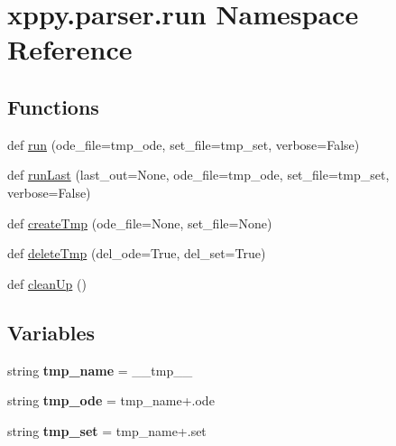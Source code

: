 \hypertarget{namespacexppy_1_1parser_1_1run}{}\section{xppy.\+parser.\+run Namespace Reference}
\label{namespacexppy_1_1parser_1_1run}
\subsection*{Functions}
\begin{DoxyCompactItemize}
\item 
def \mbox{\hyperlink{namespacexppy_1_1parser_1_1run_a32f88ffa66a68d043cef8d93210c7786}{run}} (ode\+\_\+file=tmp\+\_\+ode, set\+\_\+file=tmp\+\_\+set, verbose=False)
\item 
def \mbox{\hyperlink{namespacexppy_1_1parser_1_1run_ae60fb82821ae368a7b5cf41169ee9047}{run\+Last}} (last\+\_\+out=None, ode\+\_\+file=tmp\+\_\+ode, set\+\_\+file=tmp\+\_\+set, verbose=False)
\item 
def \mbox{\hyperlink{namespacexppy_1_1parser_1_1run_aa346685c25b7fcb37a1bd65b5dc96d32}{create\+Tmp}} (ode\+\_\+file=None, set\+\_\+file=None)
\item 
def \mbox{\hyperlink{namespacexppy_1_1parser_1_1run_ad400655fd25cbcf3e8baba3d7442af44}{delete\+Tmp}} (del\+\_\+ode=True, del\+\_\+set=True)
\item 
def \mbox{\hyperlink{namespacexppy_1_1parser_1_1run_adbf6786b0b0e4127eca343570c49d19b}{clean\+Up}} ()
\end{DoxyCompactItemize}
\subsection*{Variables}
\begin{DoxyCompactItemize}
\item 
\mbox{\label{namespacexppy_1_1parser_1_1run_a70ecc36c89c6e8e8b4c1fb7edd87b325}} 
string {\bfseries tmp\+\_\+name} = \textquotesingle{}\+\_\+\+\_\+tmp\+\_\+\+\_\+\textquotesingle{}
\item 
\mbox{\label{namespacexppy_1_1parser_1_1run_acfc7e259e0ba5cae1227e75577878273}} 
string {\bfseries tmp\+\_\+ode} = tmp\+\_\+name+\textquotesingle{}.ode\textquotesingle{}
\item 
\mbox{\label{namespacexppy_1_1parser_1_1run_a19355a67b79cf991d8972df53ffd05d6}} 
string {\bfseries tmp\+\_\+set} = tmp\+\_\+name+\textquotesingle{}.set\textquotesingle{}
\end{DoxyCompactItemize}


